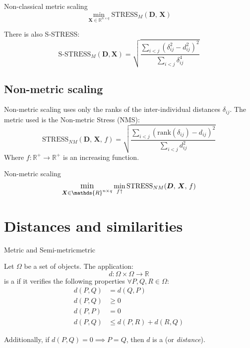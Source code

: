 \begin{problem}{Non-classical metric scaling}{}
\begin{equation*}
	\min_{\boldsymbol{X} \in \mathds{R}^{n\times q}} \text{STRESS}_M(\boldsymbol{D},\, \boldsymbol{X})
\end{equation*}
\end{problem}

There is also S-STRESS:
\begin{equation*}
	\text{S-STRESS}_M(\boldsymbol{D}, \boldsymbol{X}) = \sqrt{\frac
		{\sum_{i<j}(\delta_{ij}^2 - d_{ij}^2)^2}
		{\sum_{i<j}\delta_{ij}^4}
	}
\end{equation*}

\subsection{Non-metric scaling}
Non-metric scaling uses only the ranks of the inter-individual distances $\delta_{ij}$.
The metric used is the Non-metric Stress (NMS):
\begin{equation*}
	\text{STRESS}_{NM}(\boldsymbol{D},\, \boldsymbol{X},\, f) = \sqrt{\frac
	{\sum_{i<j}(\text{rank}(\delta_{ij}) - d_{ij})^2}
	{\sum_{i<j}d_{ij}^2}
	}
\end{equation*}
Where $f: \mathds{R}^+ \to \mathds{R}^+$ is an increasing function.

\begin{problem}{Non-metric scaling}{}
\begin{equation*}
    \mathlarger{\min_{\boldsymbol{X} \in \mathds{R}^{n\times q}}} \min_{f\uparrow} \text{STRESS}_{NM}(\boldsymbol{D},\, \boldsymbol{X},\, f)
\end{equation*}
\end{problem}

\section{Distances and similarities}

\begin{definition}{Metric and Semi-metric}{metric}

	Let $\Omega$ be a set of objects. The application:
	\begin{equation*}
		d: \Omega \times \Omega \to \mathds{R}
	\end{equation*}
	is a  if it verifies the following properties $\forall P, Q, R \in \Omega$:
	\begin{align*}
		d(P, Q) & = d(Q, P) \tag{symmetry}                         \\
		d(P, Q) & \geq 0 \tag{non-negativity}                      \\
		d(P, P) & = 0 \tag{identity}                               \\
		d(P, Q) & \leq d(P, R) + d(R, Q) \tag{triangle inequality}
	\end{align*}

	\begin{marker}
		Additionally, if $d(P, Q) = 0 \implies P = Q$, then $d$ is a  (or \emph{distance}).
	\end{marker}
\end{definition}

